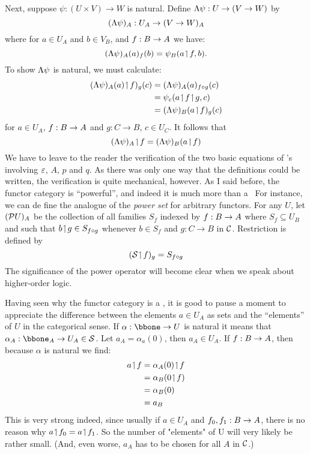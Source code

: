 Next, suppose $\psi: (U \times V) \to W$ is natural. Define
$\Lambda \psi  : U\rightarrow (V\rightarrow W)$ by
%
$$
(\Lambda \psi)_A: U_A \rightarrow (V \rightarrow W)_A
$$
%
where for $a \in U_A$ and $b \in V_B$, and $f: B \rightarrow A$ we have:
$$
(\Lambda \psi)_A (a)_f (b) = \psi_B (a \!\upharpoonleft\! f, b).
$$
To show $\Lambda\psi$ is natural, we must calculate:
\begin{align*}
(\L \psi)_A (a)\res f)_g (c) &= (\L \psi)_A(a)_{f \comp g} (c)\\
&= \psi_c(a \res f \res g,c)\\
&= (\L \psi)_B(a \res f)_g (c)
\end{align*}
%
for $a \in U_A$, $f : B \rightarrow A$ and $g: C\to B$, $c \in U_C$. It follows that
$$
(\Lambda \psi)_A \!\upharpoonleft\! f = (\Lambda \psi)_B (a \!\upharpoonleft\! f)
$$
%
We have to leave to the reader the verification of the two ba­sic equations of \ccc's involving $\varepsilon$, $A$, $p$ and $q$. As there was only one way that the definitions could be written, the verification is quite mechanical, however.
As I said before, the functor category is ``powerful'', and indeed it is much more than a \ccc\  For instance, we can de­ fine the analogue of the {\it power set} for arbitrary functors. For any $U$, let $(\mathcal P U)_A$ be the collection of all families $S_f$ indexed by $f: B \rightarrow A$ where $S_f \subseteq U_B$ and such that $b\!\upharpoonleft\! g \in S_{f \circ g}$ whenever $b\in S_f$ and $g: C\to B$ in $\mathcal C$. Restriction is defined by
$$
(\mathcal S \!\upharpoonleft\! f)_g = S_{f \circ g}
$$
%
The significance of the power operator will become clear when we speak about higher-order logic.

Having seen why the functor category is a \ccc, it is good to pause a moment to appreciate the difference between the ele­ments $a \in U_A$ as sets and the ``elements'' of $U$ in the categorical sense. If $\alpha : \bbone \to U$ is natural it means that $\alpha_A  : \bbone_A  \to U_A \in \S$. Let $a_A = \alpha_a(0)$, then $a_A \in U_A$. If $f:B \rightarrow A$, then because $\alpha$ is natural we find:
\begin{align*}
a \!\upharpoonleft\! f &= \alpha_A(0) \!\upharpoonleft\! f\\
&= \alpha_B(0 \!\upharpoonleft\! f)\\
&= \alpha_B(0)\\
&= a_B
\end{align*}
This is very strong indeed, since usually if $a \in U_A$ and $f_0, f_1 :B \rightarrow A$, there is no reason why $a \!\upharpoonleft\! f_0 = a \!\upharpoonleft\! f_1$.
So the number of "elements" of U will very likely be rather small. (And, even worse, $a_A$ has to be chosen for all $A$ in $\mathcal C$.)

